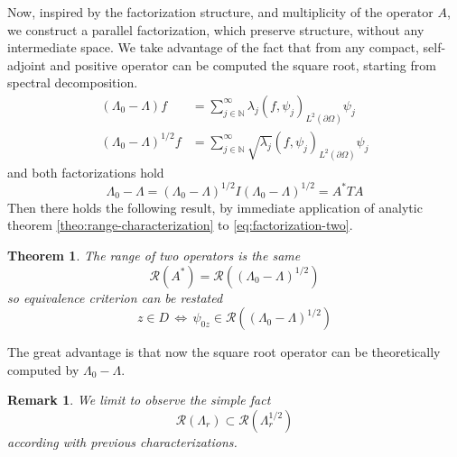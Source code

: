 \documentclass[10pt, a4paper, twoside, openright]{book}
\theoremstyle{definition}
\theoremstyle{plain}
\newtheorem{theorem}[subsection]{Theorem}
\theoremstyle{plain}
\theoremstyle{plain}
\theoremstyle{plain}
\newtheorem{remark}[subsection]{Remark}
\theoremstyle{plain}
\theoremstyle{plain}
\theoremstyle{plain}
\theoremstyle{plain}
\begin{document}
Now, inspired  by the factorization structure, and multiplicity of the operator $A$, we construct a parallel factorization, which preserve structure, without any intermediate space.
We take advantage of the fact that from any compact, self-adjoint and positive operator can be computed the square root, starting from spectral decomposition.
\begin{align}
(\Lambda_0 - \Lambda) f &= \sum_{j\in \mathbb{N}}^\infty \lambda_j(f,\psi_j)_{L^2(\partial\Omega)} \psi_j \\
(\Lambda_0 - \Lambda)^{1/2} f &= \sum_{j\in \mathbb{N}}^\infty \sqrt{\lambda_j}(f,\psi_j)_{L^2(\partial\Omega)} \psi_j 
\end{align}
and both factorizations hold
\begin{equation}
\label{eq:factorization-two}
 \Lambda_0 - \Lambda=(\Lambda_0 - \Lambda)^{1/2}I(\Lambda_0 - \Lambda)^{1/2} = A^*TA
\end{equation}
Then there holds the following result, by immediate application of analytic theorem \ref{theo:range-characterization} to \ref{eq:factorization-two}.
\begin{theorem}
 The range of two operators is the same
 \begin{equation}
  \mathcal{R}(A^*) = \mathcal{R}((\Lambda_0 - \Lambda)^{1/2})
 \end{equation}
so equivalence criterion can be restated
 \begin{equation}
  z \in D \,\Longleftrightarrow \,\psi_{0z} \in \mathcal{R}((\Lambda_0 - \Lambda)^{1/2})  
 \end{equation}
\end{theorem}
The great advantage is that now the square root operator can be theoretically computed by $\Lambda_0 - \Lambda$.
\begin{remark}
 We limit to observe the simple fact
 \begin{equation}
  \mathcal{R}(\Lambda_r) \subset \mathcal{R}(\Lambda_r^{1/2})
 \end{equation}
 according with previous characterizations.
\end{remark}
\end{document}
